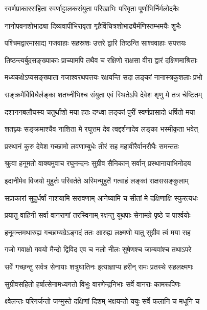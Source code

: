 \twolineshloka
{स्वर्णप्राकारसहिता स्वर्णाट्टालकसंयुता}
{परिखाभिः परिवृता पूर्णाभिर्निर्मलोदकैः} %

\twolineshloka
{नानोपवनशोभाढ्या दिव्यवापीभिरावृता}
{गृहैर्विचित्रशोभाढ्यैर्मणिस्तम्भमयैः शुभैः} %

\twolineshloka
{पश्चिमद्वारमासाद्य गजवाहाः सहस्रशः}
{उत्तरे द्वारि तिष्ठन्ति साश्ववाहाः सपत्तयः} %

\twolineshloka
{तिष्ठन्त्यर्बुदसङ्ख्याकाः प्राच्यामपि तथैव च}
{रक्षिणो राक्षसा वीरा द्वारं दक्षिणमाश्रिताः} %

\twolineshloka
{मध्यकक्षेऽप्यसङ्ख्याता गजाश्वरथपत्तयः}
{रक्षयन्ति सदा लङ्कां नानास्त्रकुशलाः प्रभो} %

\twolineshloka
{सङ्क्रमैर्विविधैर्लङ्का शतघ्नीभिश्च संयुता}
{एवं स्थितेऽपि देवेश शृणु मे तत्र चेष्टितम्} %

\twolineshloka
{दशाननबलौघस्य चतुर्थांशो मया हतः}
{दग्ध्वा लङ्कां पुरीं स्वर्णप्रासादो धर्षितो मया} %

\twolineshloka
{शतघ्न्यः सङ्क्रमाश्चैव नाशिता मे रघूत्तम}
{देव त्वद्दर्शनादेव लङ्का भस्मीकृता भवेत्} %

\twolineshloka
{प्रस्थानं कुरु देवेश गच्छामो लवणाम्बुधेः}
{तीरं सह महावीरैर्वानरौघैः समन्ततः} %

\twolineshloka
{श्रुत्वा हनूमतो वाक्यमुवाच रघुनन्दनः}
{सुग्रीव सैनिकान् सर्वान् प्रस्थानायाभिनोदय} %

\twolineshloka
{इदानीमेव विजयो मुहुर्तः परिवर्तते}
{अस्मिन्मुहुर्ते गत्वाहं लङ्कां राक्षससङ्कुलाम्} %

\twolineshloka
{सप्राकारां सुदुर्धर्षां नाशयामि सरावणाम्}
{आनेष्यामि च सीतां मे दक्षिणाक्षि स्फुरत्यधः} %

\twolineshloka
{प्रयातु वाहिनी सर्वा वानराणां तरस्विनाम्}
{रक्षन्तु यूथपाः सेनामग्रे पृष्ठे च पार्श्वयोः} %

\twolineshloka
{हनूमन्तमथारुह्य गच्छाम्यग्रेऽङ्गदं ततः}
{आरुह्य लक्ष्मणो यातु सुग्रीव त्वं मया सह} %

\twolineshloka
{गजो गवाक्षो गवयो मैन्दो द्विविद एव च}
{नलो नीलः सुषेणश्च जाम्बवांश्च तथाऽपरे} %

\twolineshloka
{सर्वे गच्छन्तु सर्वत्र सेनायाः शत्रुघातिनः}
{इत्याज्ञाप्य हरीन् रामः प्रतस्थे सहलक्ष्मणः} %

\twolineshloka
{सुग्रीवसहितो हर्षात्सेनामध्यगतो विभुः}
{वारणेन्द्रनिभाः सर्वे वानराः कामरूपिणः} %

\twolineshloka
{क्ष्वेलन्तः परिगर्जन्तो जग्मुस्ते दक्षिणां दिशम्}
{भक्षयन्तो ययुः सर्वे फलानि च मधूनि च} %

